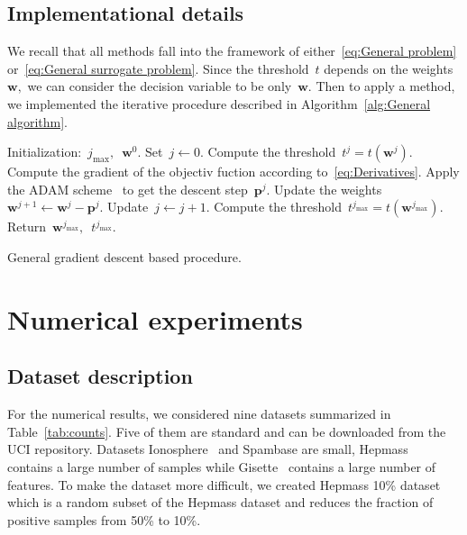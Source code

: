 \documentclass[11pt,a4paper]{article}
\theoremstyle{definition}
\begin{document}
\subsection{Implementational details}

We recall that all methods fall into the framework of either~\eqref{eq:General problem} or~\eqref{eq:General surrogate problem}. Since the threshold~$t$ depends on the weights~$\bm{w},$ we can consider the decision variable to be only~$\bm{w}.$ Then to apply a method, we implemented the iterative procedure described in Algorithm~\ref{alg:General algorithm}.
\begin{algorithm}[!ht]
  \begin{algorithmic}[1]
    \State Initialization:~$j_{\max},$~$\bm{w}^0.$
    \State Set~$j \gets 0.$  
      \State Compute the threshold~$t^j = t(\bm{w}^j).$
      \State Compute the gradient of the objectiv fuction according to~\eqref{eq:Derivatives}. 
      \State Apply the ADAM scheme~\cite{kingma2014adam} to get the descent step~$\bm{p}^j.$
      \State Update the weights~$\bm{w}^{j+1} \gets \bm{w}^j - \bm{p}^j.$
      \State Update~$j \gets j + 1.$
    \EndWhile
    \State Compute the threshold~$t^{j_{\max}} = t(\bm{w}^{j_{\max}}).$
    \State Return~$\bm{w}^{j_{\max}},$~$t^{j_{\max}}.$
  \end{algorithmic}
  \caption{General gradient descent based procedure.}
  \label{alg:General algorithm}
\end{algorithm}


\section{Numerical experiments}

\subsection{Dataset description}

For the numerical results, we considered nine datasets summarized in Table~\ref{tab:counts}. Five of them are standard and can be downloaded from the UCI repository. Datasets Ionosphere~\cite{sigillito1989ionosphere} and Spambase are small, Hepmass~\cite{baldi2016hepmass} contains a large number of samples while Gisette~\cite{guyon2005gisette} contains a large number of features. To make the dataset more difficult, we created Hepmass 10\% dataset which is a random subset of the Hepmass dataset and reduces the fraction of positive samples from 50\% to 10\%.
\end{document}
